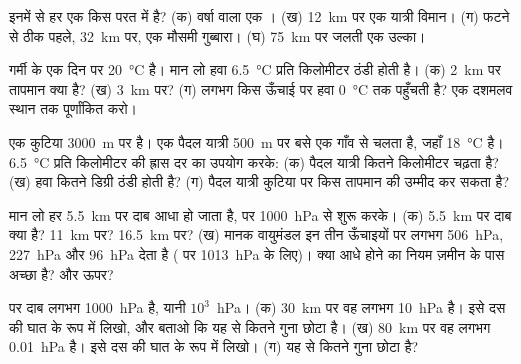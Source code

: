 \begin{exercise}[$\star$]\label{exo:g8:the-atmosphere:4}
इनमें से हर एक किस परत में है? (क) वर्षा वाला एक । (ख) \qty{12}{km} पर एक
यात्री विमान। (ग) फटने से ठीक पहले, \qty{32}{km} पर, एक मौसमी गुब्बारा।
(घ) \qty{75}{km} पर जलती एक उल्का।
\end{exercise}

\begin{exercise}[$\star\star$]\label{exo:g8:the-atmosphere:5}
गर्मी के एक दिन  पर \qty{20}{\degreeCelsius} है। मान लो हवा
\qty{6.5}{\degreeCelsius} प्रति किलोमीटर ठंडी होती है। (क) \qty{2}{km} पर तापमान
क्या है? (ख) \qty{3}{km} पर? (ग) लगभग किस ऊँचाई पर हवा \qty{0}{\degreeCelsius} तक
पहुँचती है? एक दशमलव स्थान तक पूर्णांकित करो।
\end{exercise}

\begin{exercise}[$\star\star$]\label{exo:g8:the-atmosphere:6}
एक  कुटिया \qty{3000}{m} पर है। एक पैदल यात्री \qty{500}{m} पर बसे एक गाँव
से चलता है, जहाँ \qty{18}{\degreeCelsius} है। \qty{6.5}{\degreeCelsius} प्रति
किलोमीटर की ह्रास दर का उपयोग करके: (क) पैदल यात्री कितने किलोमीटर चढ़ता है? (ख) हवा
कितने डिग्री ठंडी होती है? (ग) पैदल यात्री कुटिया पर किस तापमान की उम्मीद कर
सकता है?
\end{exercise}

\begin{exercise}[$\star\star$]\label{exo:g8:the-atmosphere:7}
मान लो हर \qty{5.5}{km} पर दाब आधा हो जाता है,  पर \qty{1000}{hPa} से शुरू
करके। (क) \qty{5.5}{km} पर दाब क्या है? \qty{11}{km} पर? \qty{16.5}{km} पर?
(ख) मानक वायुमंडल इन तीन ऊँचाइयों पर लगभग \qty{506}{hPa}, \qty{227}{hPa} और
\qty{96}{hPa} देता है ( पर \qty{1013}{hPa} के लिए)। क्या आधे होने का नियम
ज़मीन के पास अच्छा है? और ऊपर?
\end{exercise}

\begin{exercise}[$\star\star$]\label{exo:g8:the-atmosphere:8}
 पर दाब लगभग \qty{1000}{hPa} है, यानी $10^3$~hPa। (क) \qty{30}{km} पर
वह लगभग \qty{10}{hPa} है। इसे दस की घात के रूप में लिखो, और बताओ कि यह  से
कितने गुना छोटा है। (ख) \qty{80}{km} पर वह लगभग \qty{0.01}{hPa} है। इसे दस की
घात के रूप में लिखो। (ग) यह  से कितने गुना छोटा
है?
\end{exercise}

